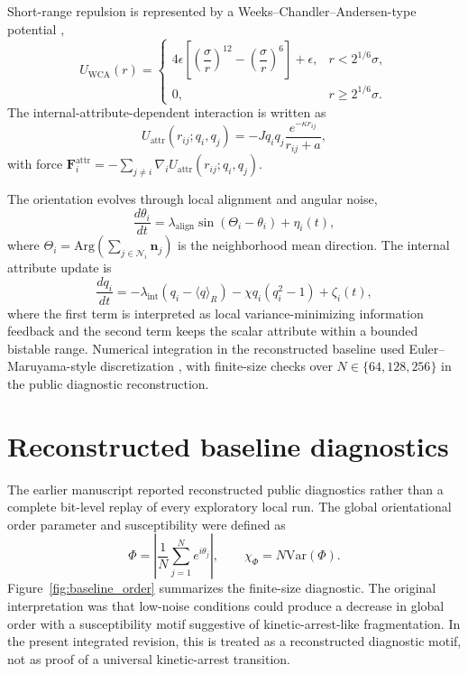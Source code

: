 \documentclass[11pt]{article}
\begin{document}
Short-range repulsion is represented by a Weeks--Chandler--Andersen-type potential \cite{weeks1971},
\begin{equation}
U_{\mathrm{WCA}}(r) =
\begin{cases}
4\epsilon\left[ \left(\dfrac{\sigma}{r}\right)^{12} - \left(\dfrac{\sigma}{r}\right)^6 \right] + \epsilon, & r < 2^{1/6}\sigma,\\
0, & r \ge 2^{1/6}\sigma.
\end{cases}
\end{equation}
The internal-attribute-dependent interaction is written as
\begin{equation}
U_{\mathrm{attr}}(r_{ij};q_i,q_j) = -Jq_iq_j\frac{e^{-\kappa r_{ij}}}{r_{ij}+a},
\end{equation}
with force $\mathbf{F}^{\mathrm{attr}}_i=-\sum_{j\ne i}\nabla_i U_{\mathrm{attr}}(r_{ij};q_i,q_j)$.

The orientation evolves through local alignment and angular noise,
\begin{equation}
\frac{d\theta_i}{dt}=\lambda_{\mathrm{align}}\sin(\Theta_i-\theta_i)+\eta_i(t),
\end{equation}
where $\Theta_i=\mathrm{Arg}(\sum_{j\in\mathcal{N}_i}\mathbf{n}_j)$ is the neighborhood mean direction. The internal attribute update is
\begin{equation}
\frac{dq_i}{dt}= -\lambda_{\mathrm{int}}(q_i-\langle q\rangle_R) - \chi q_i(q_i^2-1)+\zeta_i(t),
\end{equation}
where the first term is interpreted as local variance-minimizing information feedback and the second term keeps the scalar attribute within a bounded bistable range. Numerical integration in the reconstructed baseline used Euler--Maruyama-style discretization \cite{maruyama1955}, with finite-size checks over $N\in\{64,128,256\}$ in the public diagnostic reconstruction.

\section{Reconstructed baseline diagnostics}
The earlier manuscript reported reconstructed public diagnostics rather than a complete bit-level replay of every exploratory local run. The global orientational order parameter and susceptibility were defined as
\begin{equation}
\Phi = \left| \frac{1}{N}\sum_{j=1}^{N} e^{i\theta_j}\right|, \qquad \chi_\Phi = N\mathrm{Var}(\Phi).
\end{equation}
Figure~\ref{fig:baseline_order} summarizes the finite-size diagnostic. The original interpretation was that low-noise conditions could produce a decrease in global order with a susceptibility motif suggestive of kinetic-arrest-like fragmentation. In the present integrated revision, this is treated as a reconstructed diagnostic motif, not as proof of a universal kinetic-arrest transition.
\end{document}

